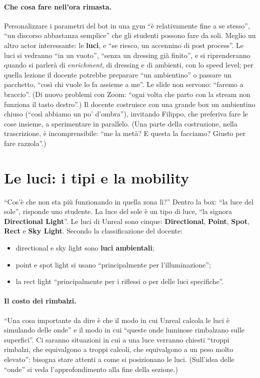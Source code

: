 \paragraph{Che cosa fare nell'ora rimasta.} Personalizzare i parametri del bot in una gym
``è relativamente fine a se stesso'', ``un discorso abbastanza semplice'' che gli studenti
possono fare da soli. Meglio un altro actor interessante: le \textbf{luci}, e ``se riesco,
un accennino di post process''. Le luci si vedranno ``in un vuoto'', ``senza un dressing già
finito'', e si riprenderanno quando si parlerà di \emph{enrichment}, di dressing e di
ambienti, con lo speed level; per quella lezione il docente potrebbe preparare
``un ambientino'' o passare un pacchetto, ``così chi vuole lo fa assieme a me''. Le slide
non servono: ``faremo a braccio''. (Di nuovo problemi con Zoom: ``ogni volta che parto con la
stream non funziona il tasto destro''.) Il docente costruisce con una grande box un
ambientino chiuso (``così abbiamo un po' d'ombra''), invitando Filippo, che preferiva fare
le cose insieme, a sperimentare in parallelo. (Una parte della costruzione, nella
trascrizione, è incomprensibile: ``me la metà? E questa la facciamo? Giusto per fare
razzola''.)

\section{Le luci: i tipi e la mobility}
\label{ue13:sec:mobility}

``Cos'è che non sta più funzionando in quella zona lì?'' Dentro la box: ``la luce del sole'',
risponde uno studente. La luce del sole è un tipo di luce, ``la signora
\textbf{Directional Light}''. Le luci di Unreal sono cinque: \textbf{Directional},
\textbf{Point}, \textbf{Spot}, \textbf{Rect} e \textbf{Sky Light}. Secondo la classificazione
del docente:
\begin{itemize}
  \item directional e sky light sono \textbf{luci ambientali};
  \item point e spot light si usano ``principalmente per l'illuminazione'';
  \item la rect light ``principalmente per i riflessi o per delle luci specifiche''.
\end{itemize}

\paragraph{Il costo dei rimbalzi.} ``Una cosa importante da dire è che il modo in cui Unreal
calcola le luci è simulando delle onde'' e il modo in cui ``queste onde luminose rimbalzano
sulle superfici''. Ci saranno situazioni in cui a una luce verranno chiesti ``troppi
rimbalzi, che equivalgono a troppi calcoli, che equivalgono a un peso molto elevato'':
bisogna stare attenti a come si posizionano le luci. (Sull'idea delle ``onde'' si veda
l'approfondimento alla fine della sezione.)

